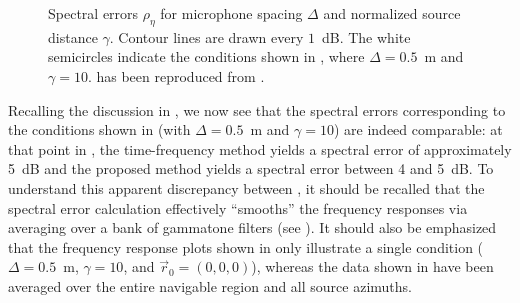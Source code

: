\begin{figure}[t]
	\caption[Contour plots of spectral errors for each interpolation method.]{
	Spectral errors $\rho_\eta$ for microphone spacing $\Delta$ and normalized source distance $\gamma$.
  Contour lines are drawn every $1$~dB.
  The white semicircles indicate the conditions shown in , where $\Delta = 0.5$~m and $\gamma = 10$.
   has been reproduced from .}
	\label{fig:09_Thiergart_Comparison:Spectral_Errors}
\end{figure}

Recalling the discussion in , we now see that the spectral errors corresponding to the conditions shown in  (with $\Delta = 0.5$~m and $\gamma = 10$) are indeed comparable:
at that point in , the time-frequency method yields a spectral error of approximately 5~dB and the proposed method yields a spectral error between 4 and 5~dB.
To understand this apparent discrepancy between , it should be recalled that the spectral error calculation effectively ``smooths'' the frequency responses via averaging over a bank of gammatone filters (see ).
It should also be emphasized that the frequency response plots shown in  only illustrate a single condition ($\Delta = 0.5$~m, $\gamma = 10$, and $\vec{r}_0 = (0,0,0)$), whereas the data shown in  have been averaged over the entire navigable region and all source azimuths.


